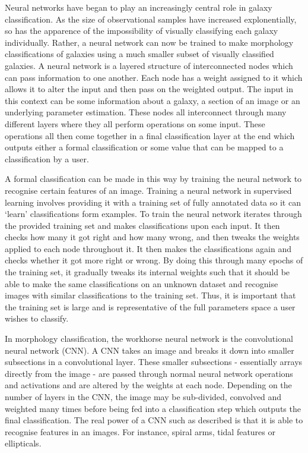 Neural networks have began to play an increasingly central role in galaxy classification. As the size of observational samples have increased explonentially, so has the apparence of the impossibility of visually classifying each galaxy individually. Rather, a neural network can now be trained to make morphology classifications of galaxies using a much smaller subset of visually classified galaxies. A neural network is a layered structure of interconnected nodes which can pass information to one another. Each node has a weight assigned to it which allows it to alter the input and then pass on the weighted output. The input in this context can be some information about a galaxy, a section of an image or an underlying parameter estimation. These nodes all interconnect through many different layers where they all perform operations on some input. These operations all then come together in a final classification layer at the end which outputs either a formal classification or some value that can be mapped to a classification by a user.

A formal classification can be made in this way by training the neural network to recognise certain features of an image. Training a neural network in supervised learning involves providing it with a training set of fully annotated data so it can `learn' classifications form examples. To train the neural network iterates through the provided training set and makes classifications upon each input. It then checks how many it got right and how many wrong, and then tweaks the weights applied to each node throughout it. It then makes the classifications again and checks whether it got more right or wrong. By doing this through many epochs of the training set, it gradually tweaks its internal weights such that it should be able to make the same classifications on an unknown dataset and recognise images with similar classifications to the training set. Thus, it is important that the training set is large and is representative of the full parameters space a user wishes to classify.

In morphology classification, the workhorse neural network is the convolutional neural network (CNN). A CNN takes an image and breaks it down into smaller subsections in a convolutional layer. These smaller subsections - essentially arrays directly from the image - are passed through normal neural network operations and activations and are altered by the weights at each node. Depending on the number of layers in the CNN, the image may be sub-divided, convolved and weighted many times before being fed into a classification step which outputs the final classification. The real power of a CNN such as described is that it is able to recognise features in an images. For instance, spiral arms, tidal features or ellipticals. 

